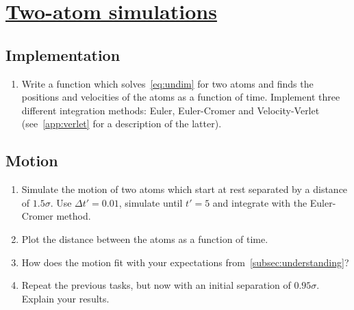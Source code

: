 \documentclass[11pt,british,a4paper]{report}
\begin{document}

\section{\underline{Two-atom simulations}}

\subsection{Implementation}
\begin{enumerate}[label=\roman*.]
    \item Write a function which solves~\vref{eq:undim} for two atoms and finds the positions and velocities of the atoms as a function of time. Implement three different integration methods:
        Euler, Euler-Cromer and Velocity-Verlet (see~\vref{app:verlet} for a description of the latter).
\end{enumerate}

\subsection{Motion}\label{subsec:2motion}
\begin{enumerate}[label=\roman*.]
    \item Simulate the motion of two atoms which start at rest separated by a distance of \(\num{1.5}\sigma\). Use \(\Delta t'=\num{0.01}\), simulate until \(t'=5\) and integrate with the Euler-Cromer method.
    \item Plot the distance between the atoms as a function of time.
    \item How does the motion fit with your expectations from~\vref{subsec:understanding}?
    \item Repeat the previous tasks, but now with an initial separation of \(\num{0.95}\sigma\). Explain your results.
\end{enumerate}
\end{document}
